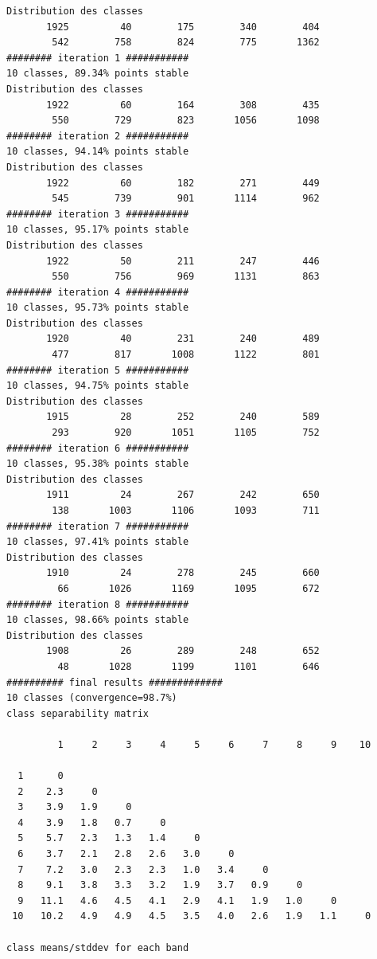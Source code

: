 \documentclass[environments,article,submit,pdftex,moreauthors]{Definitions/mdpi}
\begin{document}
\begin{scriptsize}
\begin{verbatim}
Distribution des classes
       1925         40        175        340        404
        542        758        824        775       1362
######## iteration 1 ###########
10 classes, 89.34% points stable
Distribution des classes
       1922         60        164        308        435
        550        729        823       1056       1098
######## iteration 2 ###########
10 classes, 94.14% points stable
Distribution des classes
       1922         60        182        271        449
        545        739        901       1114        962
######## iteration 3 ###########
10 classes, 95.17% points stable
Distribution des classes
       1922         50        211        247        446
        550        756        969       1131        863
######## iteration 4 ###########
10 classes, 95.73% points stable
Distribution des classes
       1920         40        231        240        489
        477        817       1008       1122        801
######## iteration 5 ###########
10 classes, 94.75% points stable
Distribution des classes
       1915         28        252        240        589
        293        920       1051       1105        752
######## iteration 6 ###########
10 classes, 95.38% points stable
Distribution des classes
       1911         24        267        242        650
        138       1003       1106       1093        711
######## iteration 7 ###########
10 classes, 97.41% points stable
Distribution des classes
       1910         24        278        245        660
         66       1026       1169       1095        672
######## iteration 8 ###########
10 classes, 98.66% points stable
Distribution des classes
       1908         26        289        248        652
         48       1028       1199       1101        646
########## final results #############
10 classes (convergence=98.7%)
class separability matrix

         1     2     3     4     5     6     7     8     9    10

  1      0
  2    2.3     0
  3    3.9   1.9     0
  4    3.9   1.8   0.7     0
  5    5.7   2.3   1.3   1.4     0
  6    3.7   2.1   2.8   2.6   3.0     0
  7    7.2   3.0   2.3   2.3   1.0   3.4     0
  8    9.1   3.8   3.3   3.2   1.9   3.7   0.9     0
  9   11.1   4.6   4.5   4.1   2.9   4.1   1.9   1.0     0
 10   10.2   4.9   4.9   4.5   3.5   4.0   2.6   1.9   1.1     0

class means/stddev for each band


\end{verbatim}
\end{scriptsize}
\end{document}
